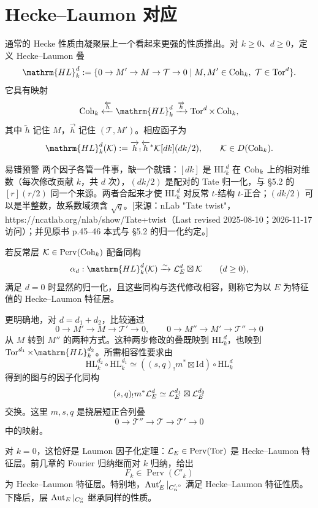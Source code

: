\section{Hecke–Laumon 对应}\label{sec:8.4}
通常的 Hecke 性质由凝聚层上一个看起来更强的性质推出。对 $k\ge0$、$d\ge0$，定义 Hecke–Laumon 叠
\[\mathrm{HL}_k^d:=\{0\to M'\to M\to\mathcal T\to0\mid M,M'\in\Coh_k,\ \mathcal T\in\Tor^d\}.\]
它具有映射
\[\Coh_k\xleftarrow{\overleftarrow h}\mathrm{HL}_k^d\xrightarrow{\overrightarrow h}\Tor^d\times\Coh_k,\]
其中 $\overleftarrow h$ 记住 $M$，$\overrightarrow h$ 记住 $(\mathcal T,M')$。相应函子为
\[\mathrm{HL}_k^d(\cK):=\overrightarrow h_!\overleftarrow h^*\cK[dk](dk/2),\qquad\cK\in D(\Coh_k).\]
\begin{transnote}{易错预警}
两个因子各管一件事，缺一个就错：$[dk]$ 是 $\mathrm{HL}_k^d$ 在 $\operatorname{Coh}_k$ 上的相对维数（每次修改贡献 $k$，共 $d$ 次），$(dk/2)$ 是配对的 Tate 归一化，与 §5.2 的 $[r](r/2)$ 同一个来源。两者合起来才使 $\mathrm{HL}_k^d$ 对反常 $t$-结构 $t$-正合；$(dk/2)$ 可以是半整数，故系数域须含 $\sqrt q$。[来源：nLab "Tate twist"，https://ncatlab.org/nlab/show/Tate+twist（Last revised 2025-08-10；2026-11-17 访问）；并见原书 p.45–46 本式与 §5.2 的归一化约定。]
\end{transnote}
\begin{definition*}{}
若反常层 $\mathcal{K}\in\operatorname{Perv}(\operatorname{Coh}_k)$ 配备同构
\[\alpha_d:\mathrm{HL}_k^d(\cK)\xrightarrow{\sim}\cL_E^d\boxtimes\cK\qquad(d\ge0),\]
满足 $d=0$ 时显然的归一化，且这些同构与迭代修改相容，则称它为以 $E$ 为特征值的 Hecke–Laumon 特征层。
\end{definition*}
更明确地，对 $d=d_1+d_2$，比较通过
\[0\to M'\to M\to\mathcal T'\to0,\qquad0\to M''\to M'\to\mathcal T''\to0\]
从 $M$ 转到 $M''$ 的两种方式。这种两步修改的叠既映到 $\mathrm{HL}_k^d$，也映到 $\Tor^{d_1}\times\mathrm{HL}_k^{d_2}$。所需相容性要求由
\[\mathrm{HL}_k^{d_2}\circ\mathrm{HL}_k^{d_1}\simeq((s,q)_!m^*\boxtimes\mathrm{Id})\circ\mathrm{HL}_k^d\]
得到的图与的因子化同构
\[(s,q)_!m^*\mathcal{L}_E^d\simeq\mathcal{L}_E^{d_1}\boxtimes\mathcal{L}_E^{d_2}\]
交换。这里 $m,s,q$ 是挠层短正合列叠
\[0\longrightarrow\mathcal T''\longrightarrow\mathcal T\longrightarrow\mathcal T'\longrightarrow0\]
中的映射。

对 $k=0$，这恰好是 Laumon 因子化定理：$\mathcal{L}_E\in\operatorname{Perv}(\operatorname{Tor})$ 是 Hecke–Laumon 特征层。前几章的 Fourier 归纳继而对 $k$ 归纳，给出
\[F_k\in\operatorname{Perv}(C'_k)\]
为 Hecke–Laumon 特征层。特别地，$\operatorname{Aut}'_E|_{C_n^{\prime,\circ}}$ 满足 Hecke–Laumon 特征性质。下降后，层 $\operatorname{Aut}_E|_{C_n^\circ}$ 继承同样的性质。
